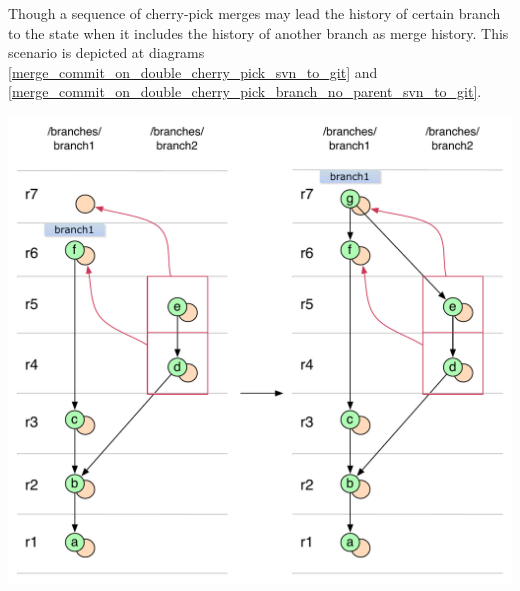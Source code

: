 Though a sequence of cherry-pick merges may lead the history of certain branch to the state when it includes the history of another branch as merge history. This scenario is depicted at diagrams \ref{merge_commit_on_double_cherry_pick_svn_to_git} and \ref{merge_commit_on_double_cherry_pick_branch_no_parent_svn_to_git}.

\begin{center}
\includegraphics[width=\textwidth]{img/diagrams/merge_commit_on_double_cherry_pick_svn_to_git.pdf}%
\label{merge_commit_on_double_cherry_pick_svn_to_git}%
\end{center}

